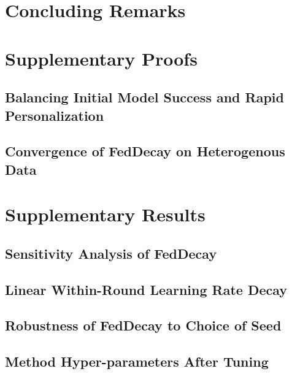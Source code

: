 \documentclass[twoside, 11pt]{article}
\begin{document}
    \section{Concluding Remarks}
    \label{decay-conclusion}
    


    \clearpage
    

    \clearpage
    \appendix

    \section{Supplementary Proofs}

        \subsection{Balancing Initial Model Success and Rapid Personalization}
        \label{pf: decay-pf-taylor}
        

        \subsection{Convergence of FedDecay on Heterogenous Data}
        \label{pf: decay-pf-conv}
        

    \section{Supplementary Results}

        \subsection{Sensitivity Analysis of FedDecay}
        \label{app: decay-app-sens}
        

        \subsection{Linear Within-Round Learning Rate Decay}
        \label{app: decay-app-scheme}
        

        \subsection{Robustness of FedDecay to Choice of Seed}
        \label{app: decay-app-seed}
        

        \subsection{Method Hyper-parameters After Tuning}
        \label{app: decay-app-params}
        
\end{document}
